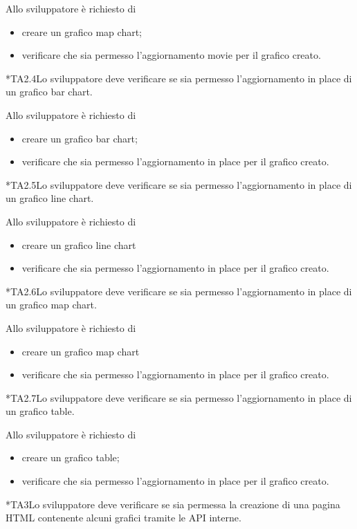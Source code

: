 		Allo sviluppatore è richiesto di
		\begin{itemize}
			\item creare un grafico map chart;
			\item verificare che sia permesso l'aggiornamento movie per il grafico creato.
		\end{itemize}

	*{TA2.4}Lo sviluppatore deve verificare se sia permesso l'aggiornamento in place di un grafico bar chart.
		
		Allo sviluppatore è richiesto di
		\begin{itemize}
			\item creare un grafico bar chart;
			\item verificare che sia permesso l'aggiornamento in place per il grafico creato.
		\end{itemize}

	*{TA2.5}Lo sviluppatore deve verificare se sia permesso l'aggiornamento in place di un grafico line chart.
		
		Allo sviluppatore è richiesto di
		\begin{itemize}
			\item creare un grafico line chart
			\item verificare che sia permesso l'aggiornamento in place per il grafico creato.
		\end{itemize}

	*{TA2.6}Lo sviluppatore deve verificare se sia permesso l'aggiornamento in place di un grafico map chart.
		
		Allo sviluppatore è richiesto di
		\begin{itemize}
			\item creare un grafico map chart
			\item verificare che sia permesso l'aggiornamento in place per il grafico creato.
		\end{itemize}

	*{TA2.7}Lo sviluppatore deve verificare se sia permesso l'aggiornamento in place di un grafico table.
		
		Allo sviluppatore è richiesto di
		\begin{itemize}
			\item creare un grafico table;
			\item verificare che sia permesso l'aggiornamento in place per il grafico creato.
		\end{itemize}

	*{TA3}Lo sviluppatore deve verificare se sia permessa la creazione di una pagina HTML contenente alcuni grafici tramite le API interne.
		
